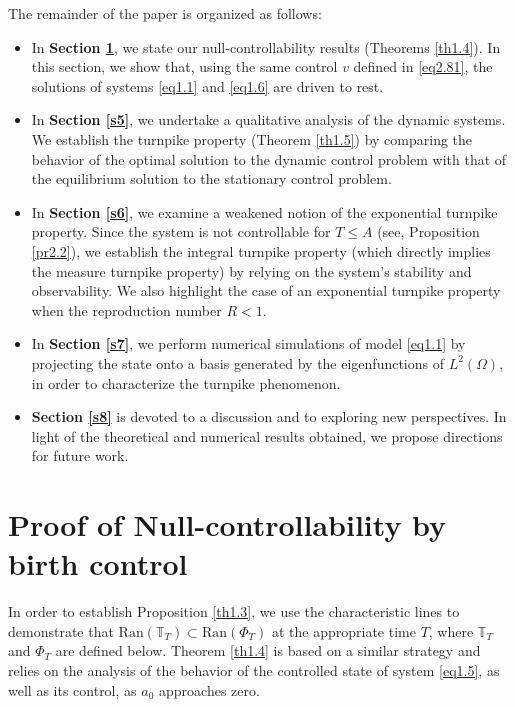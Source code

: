 \documentclass[10pt, a4]{amsart}
\theoremstyle{plain}
\theoremstyle{definition}
\theoremstyle{remark}
\numberwithin{equation}{section}
\begin{document}
The remainder of the paper is organized as follows:
\begin{itemize}
    \item[•] In \textbf{Section \ref{s4}}, we state our null‐controllability results (Theorems \ref{th1.4}). In this section, we show that, using the same control $v$ defined in \eqref{eq2.81}, the solutions of systems \eqref{eq1.1} and \eqref{eq1.6} are driven to rest.
    \item[•] In {\bf Section \ref{s5}}, we undertake a qualitative analysis of the dynamic systems. We establish the turnpike property (Theorem \ref{th1.5}) by comparing the behavior of the optimal solution to the dynamic control problem with that of the equilibrium solution to the stationary control problem.
     \item[•] In {\bf Section \ref{s6}}, we examine a weakened notion of the exponential turnpike property. Since the system is not controllable for \(T \le A\) (see, Proposition \ref{pr2.2}), we establish the integral turnpike property (which directly implies the measure turnpike property) by relying on the system’s stability and observability. We also highlight the case of an exponential turnpike property when the reproduction number \(R < 1\).
    \item[•] In {\bf Section \ref{s7}}, we perform numerical simulations of model \eqref{eq1.1} by projecting the state onto a basis generated by the eigenfunctions of \(L^2(\Omega)\), in order to characterize the turnpike phenomenon. %
    \item[•] \textbf{Section \ref{s8}} is devoted to a discussion and to exploring new perspectives. In light of the theoretical and numerical results obtained, we propose directions for future work.
\end{itemize}
\section{Proof of Null-controllability by birth control}\label{s4}%
In order to establish Proposition \ref{th1.3}, we use the characteristic lines to demonstrate that \(\mathrm{Ran}(\mathbb{T}_T) \subset \mathrm{Ran}(\Phi_T)\) at the appropriate time \(T\), where \(\mathbb{T}_T\) and \(\Phi_T\) are defined below. Theorem \ref{th1.4} is based on a similar strategy and relies on the analysis of the behavior of the controlled state of system \eqref{eq1.5}, as well as its control, as \(a_0\) approaches zero. 
\end{document}
